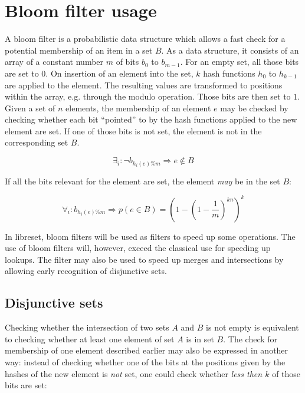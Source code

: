 \section{Bloom filter usage}
\label{sec:bloom_filter}

    A bloom filter is a probabilistic data structure which allows a fast check
    for a potential membership of an item in a set $B$.
    As a data structure, it consists of an array of a constant number $m$ of
    bits $b_0$ to $b_{m-1}$.
    For an empty set, all those bits are set to $0$.
    On insertion of an element into the set, $k$ hash functions $h_0$ to
    $h_{k-1}$ are applied to the element.
    The resulting values are transformed to positions within the array, e.g.
    through the modulo operation.
    Those bits are then set to $1$.
    Given a set of $n$ elements, the membership of an element $e$ may be checked
    by checking whether each bit ``pointed'' to by the hash functions applied to
    the new element are set.
    If one of those bits is not set, the element is not in the corresponding set
    $B$.

    \begin{equation}
        \exists_i : \neg b_{h_i(e)\%m} \Rightarrow e \notin B
    \end{equation}

    If all the bits relevant for the element are set, the element \emph{may} be
    in the set $B$:

    \begin{equation}
        \forall_i : b_{h_i(e)\%m} \Rightarrow
        p(e \in B) = \left(1 - \left(1 - \frac{1}{m} \right)^{kn} \right)^k
    \end{equation}

    In libreset, bloom filters will be used as filters to speed up some
    operations.
    The use of bloom filters will, however, exceed the classical use for
    speeding up lookups.
    The filter may also be used to speed up merges and intersections by allowing
    early recognition of disjunctive sets.

    \subsection{Disjunctive sets}
    \label{sec:bloom_filter-disjunctive_sets}

        Checking whether the intersection of two sets $A$ and $B$ is not empty
        is equivalent to checking whether at least one element of set $A$ is in
        set $B$.
        The check for membership of one element described earlier may also be
        expressed in another way: instead of checking whether one of the bits
        at the positions given by the hashes of the new element is \emph{not}
        set, one could check whether \emph{less then $k$} of those bits are set:

